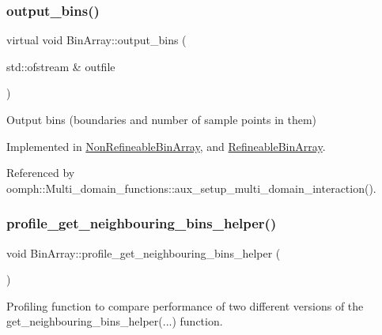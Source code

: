 \mbox{\label{classBinArray_a66fe7e379a53e3fee81ead7ef4045b40}} 
\subsubsection{\texorpdfstring{output\+\_\+bins()}{output\_bins()}}
{\footnotesize\ttfamily virtual void Bin\+Array\+::output\+\_\+bins (\begin{DoxyParamCaption}\item[{std\+::ofstream \&}]{outfile }\end{DoxyParamCaption})\hspace{0.3cm}{\ttfamily [pure virtual]}}



Output bins (boundaries and number of sample points in them) 



Implemented in \hyperlink{classNonRefineableBinArray_aace5835e23625cc491a2fe084823ac3a}{Non\+Refineable\+Bin\+Array}, and \hyperlink{classRefineableBinArray_ab92ef5225b96b684b58f3a0905aacf75}{Refineable\+Bin\+Array}.



Referenced by oomph\+::\+Multi\+\_\+domain\+\_\+functions\+::aux\+\_\+setup\+\_\+multi\+\_\+domain\+\_\+interaction().

\mbox{\label{classBinArray_af2a223b6a244b75d4c1e358a95aa57f1}} 
\subsubsection{\texorpdfstring{profile\+\_\+get\+\_\+neighbouring\+\_\+bins\+\_\+helper()}{profile\_get\_neighbouring\_bins\_helper()}}
{\footnotesize\ttfamily void Bin\+Array\+::profile\+\_\+get\+\_\+neighbouring\+\_\+bins\+\_\+helper (\begin{DoxyParamCaption}{ }\end{DoxyParamCaption})}



Profiling function to compare performance of two different versions of the get\+\_\+neighbouring\+\_\+bins\+\_\+helper(...) function. 

